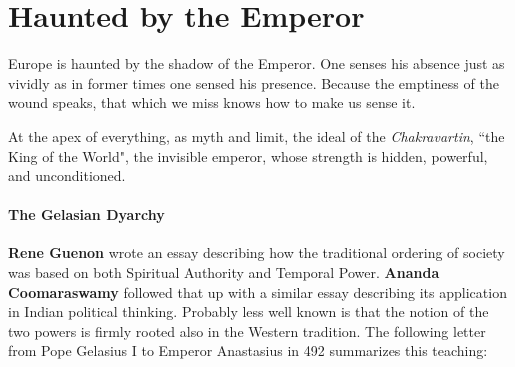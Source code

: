 \section{Haunted by the Emperor}

\begin{quotex}
Europe is haunted by the shadow of the Emperor. One senses his absence just as vividly as in former times one sensed his presence. Because the emptiness of the wound speaks, that which we miss knows how to make us sense it. 

At the apex of everything, as myth and limit, the ideal of the \emph{Chakravartin}, ``the King of the World", the invisible emperor, whose strength is hidden, powerful, and unconditioned. 

\end{quotex}
\paragraph{The Gelasian Dyarchy}
\textbf{Rene Guenon} wrote an essay describing how the traditional ordering of society was based on both Spiritual Authority and Temporal Power. \textbf{Ananda Coomaraswamy} followed that up with a similar essay describing its application in Indian political thinking. Probably less well known is that the notion of the two powers is firmly rooted also in the Western tradition. The following letter from Pope Gelasius I to Emperor Anastasius in 492 summarizes this teaching:


